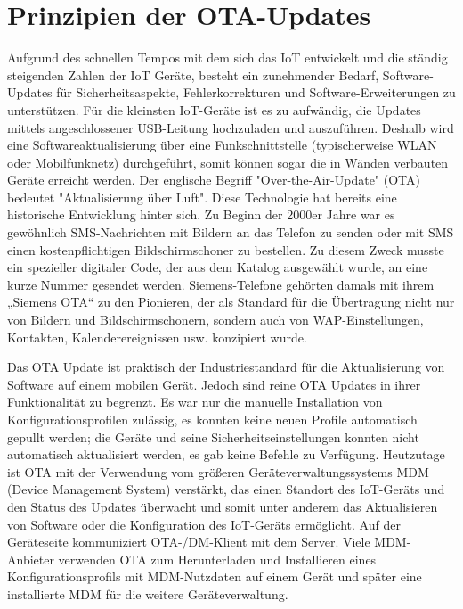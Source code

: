 
\chapter{Prinzipien der OTA-Updates}
\label{sec:princip}
Aufgrund des schnellen Tempos mit dem sich das IoT entwickelt und die ständig steigenden Zahlen der IoT Geräte, besteht ein zunehmender Bedarf, Software-Updates für Sicherheitsaspekte, Fehlerkorrekturen und Software-Erweiterungen zu unterstützen. Für die kleinsten IoT-Geräte ist es zu aufwändig, die Updates mittels angeschlossener USB-Leitung hochzuladen und auszuführen. Deshalb wird eine Softwareaktualisierung über eine Funkschnittstelle (typischerweise WLAN oder Mobilfunknetz) durchgeführt, somit können sogar die in Wänden verbauten Geräte erreicht werden. Der englische Begriff "Over-the-Air-Update" (OTA) bedeutet "Aktualisierung über Luft". Diese Technologie hat bereits eine historische Entwicklung hinter sich. Zu Beginn der 2000er Jahre war es gewöhnlich SMS-Nachrichten mit Bildern an das Telefon zu senden oder mit SMS einen kostenpflichtigen Bildschirmschoner zu bestellen. Zu diesem Zweck musste ein spezieller digitaler Code, der aus dem Katalog ausgewählt wurde, an eine kurze Nummer gesendet werden. Siemens-Telefone gehörten damals mit ihrem „Siemens OTA“ zu den Pionieren, der als Standard für die Übertragung nicht nur von Bildern und Bildschirmschonern, sondern auch von WAP-Einstellungen, Kontakten, Kalenderereignissen usw. konzipiert wurde.

Das OTA Update ist praktisch der Industriestandard für die Aktualisierung von Software auf einem mobilen Gerät. Jedoch sind reine OTA Updates in ihrer Funktionalität zu begrenzt. Es war nur die manuelle Installation von Konfigurationsprofilen zulässig, es konnten keine neuen Profile automatisch gepullt werden; die Geräte und seine Sicherheitseinstellungen konnten nicht automatisch aktualisiert werden, es gab keine Befehle zu Verfügung. Heutzutage ist OTA mit der Verwendung vom größeren Geräteverwaltungssystems MDM (Device Management System) verstärkt, das einen Standort des IoT-Geräts und den Status des Updates überwacht und somit unter anderem das Aktualisieren von Software oder die Konfiguration des IoT-Geräts ermöglicht. Auf der Geräteseite kommuniziert OTA-/DM-Klient mit dem Server. Viele MDM-Anbieter verwenden OTA zum Herunterladen und Installieren eines Konfigurationsprofils mit MDM-Nutzdaten auf einem Gerät und später eine installierte MDM für die weitere Geräteverwaltung.

